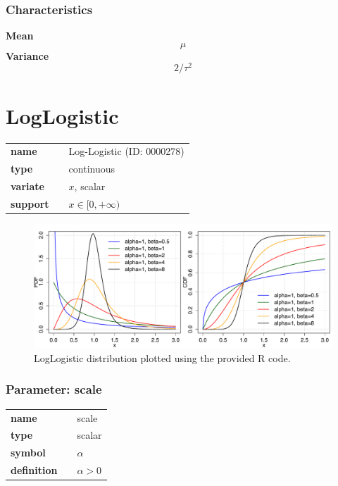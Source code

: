 \subsubsection*{Characteristics}
\smallskip \noindent \hspace{.2cm} \textbf{Mean} 
\begin{equation*}\mu\end{equation*}
\smallskip \noindent \hspace{.2cm} \textbf{Variance} 
\begin{equation*}2 / \tau^2\end{equation*}
\smallskip
\section*{LogLogistic} 

  \bigskip 

\begin{tabular}{p{2cm}cl}
\textbf{name} & & Log-Logistic (ID: 0000278)\\ 
 
\textbf{type} & & continuous \\ 

\textbf{variate} & & $x$, scalar \\ 

\textbf{support} & & $x \in [0,+\infty)$
\end{tabular}

\begin{figure}[ht!]
\centering
  \includegraphics[width=140mm]{pics/LogLogistic.pdf}
 \caption{LogLogistic distribution plotted using the provided R code.}
 \label{fig:LogLogistic}
\end{figure}

\subsubsection*{Parameter: scale}

\noindent\begin{tabular}{p{2cm}cl}
\textbf{name} & & scale \\
\textbf{type} & & scalar \\
\textbf{symbol} & & $\alpha$  \\
\textbf{definition} & & $\alpha > 0$
\end{tabular}
